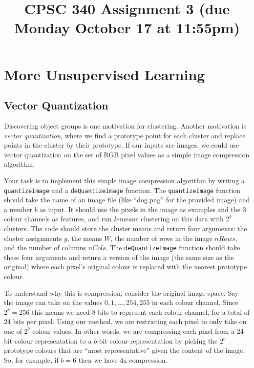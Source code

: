 \documentclass{article}
\begin{document}
\title{CPSC 340 Assignment 3 (due Monday October 17 at 11:55pm)}
\author{}
\date{}
\maketitle
\vspace{-4em}


\section{More Unsupervised Learning}


\subsection{Vector Quantization}


Discovering object groups is one motivation for clustering. Another motivation is \emph{vector quantization}, where we find a prototype point for each cluster and replace points in the cluster by their prototype. If our inputs are images, we could use vector quantization on the set of RGB pixel values as a simple image compression algorithm.

Your task is to implement this simple image compression algorithm by writing a \texttt{quantizeImage} and a \texttt{deQuantizeImage} function. The \texttt{quantizeImage} function should take the name of an image file (like ``dog.png'' for the provided image) and a number $b$ as input. It should use the pixels in the image as examples and the 3 colour channels as features, and run $k$-means clustering on this data with $2^b$ clusters. The code should store the cluster means and return four arguments: the cluster assignments $y$, the means $W$, the number of rows in the image $nRows$, and the number of columns $nCols$. The \texttt{deQuantizeImage} function should take these four arguments and return a version of the image (the same size as the original) where each pixel's original colour is replaced with the nearest prototype colour.

To understand why this is compression, consider the original image space. Say the image can take on the values $0,1,\ldots,254,255$ in each colour channel. Since $2^8=256$ this means we need 8 bits to represent each colour channel, for a total of 24 bits per pixel. Using our method, we are restricting each pixel to only take on one of $2^b$ colour values. In other words, we are compressing each pixel from a 24-bit colour representation to a $b$-bit colour representation by picking the $2^b$ prototype colours that are ``most representative'' given the content of the image. So, for example, if $b=6$ then we have 4x compression.
\end{document}
